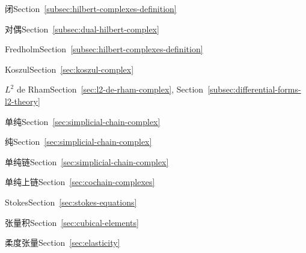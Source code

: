 \begin{theindex}
\subsubitem {}\label{index:complex-hilbert-closed}{闭}\quad Section~\ref{subsec:hilbert-complexes-definition}

\subsubitem {}\label{index:complex-hilbert-dual}{对偶}\quad Section~\ref{subsec:dual-hilbert-complex}

\subsubitem {}\label{index:complex-hilbert-fredholm}{Fredholm}\quad Section~\ref{subsec:hilbert-complexes-definition}

\subitem {}\label{index:complex-koszul}{Koszul}\quad Section~\ref{sec:koszul-complex}

\subitem {}\label{index:complex-l-2-de-rham}{$L^2$ de Rham}\quad Section~\ref{sec:l2-de-rham-complex}, Section~\ref{subsec:differential-forms-l2-theory}

\subitem {}\label{index:complex-simplicial}{单纯}\quad Section~\ref{sec:simplicial-chain-complex}

\subsubitem {}\label{index:complex-simplicial-pure}{纯}\quad Section~\ref{sec:simplicial-chain-complex}

\subitem {}\label{index:complex-simplicial-chain}{单纯链}\quad Section~\ref{sec:simplicial-chain-complex}

\subitem {}\label{index:complex-simplicial-cochain}{单纯上链}\quad Section~\ref{sec:cochain-complexes}

\subitem {}\label{index:complex-stokes}{Stokes}\quad Section~\ref{sec:stokes-equations}

\subitem {}\label{index:complex-tensor-product}{张量积}\quad Section~\ref{sec:cubical-elements}

\item {}\label{index:compliance-tensor}{柔度张量}\quad Section~\ref{sec:elasticity}


\end{theindex}
